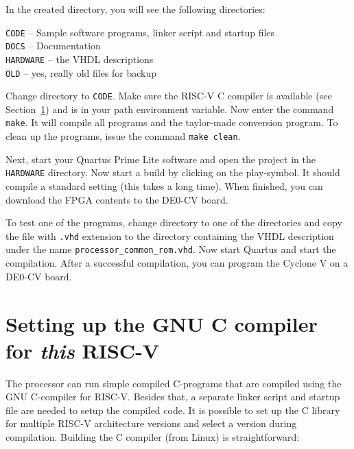 \documentclass[12pt]{article}
\begin{document}
In the created directory, you will see the following directories:

\texttt{CODE} -- Sample software programs, linker script and startup files\\
\texttt{DOCS} -- Documentation\\
\texttt{HARDWARE} -- the VHDL descriptions \\
\texttt{OLD} -- yes, really old files for backup

Change directory to \texttt{CODE}. Make sure the RISC-V C compiler is available (see Section~\ref{sec:ccompiler}) and is in your path environment variable. Now enter the command \texttt{make}. It will compile all programs and the taylor-made conversion program. To clean up the programs, issue the command \texttt{make clean}.

Next, start your Quartus Prime Lite software and open the project in the \texttt{HARDWARE} directory. Now start a build by clicking on the play-symbol. It should compile a standard setting (this takes a long time). When finished, you can download the FPGA contents to the DE0-CV board.

To test one of the programs, change directory to one of the directories and copy the file with \texttt{.vhd} extension to the directory containing the VHDL description under the name \texttt{processor\_common\_rom.vhd}.
Now start Quartus and start the compilation. After a successful compilation, you can program the Cyclone V on a DE0-CV board.

\section{Setting up the GNU C compiler for \textit{this} RISC-V}
\label{sec:ccompiler}
The processor can run simple compiled C-programs that are compiled using the GNU C-compiler for RISC-V. Besides that, a separate linker script and startup file are needed to setup the compiled code. It is possible to set up the C library for multiple RISC-V architecture versions and select a version during compilation. Building the C compiler (from Linux) is straightforward:
\end{document}

